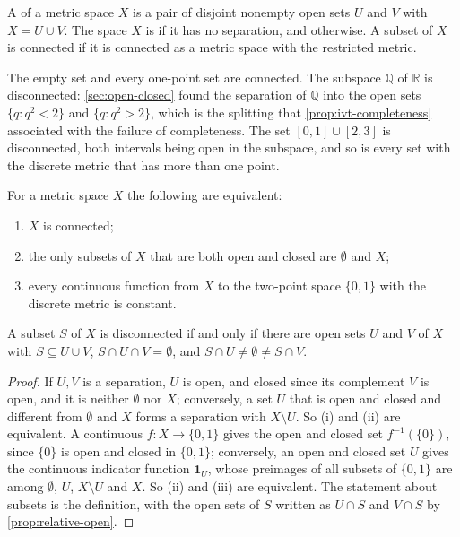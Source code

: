 \begin{definition}
\label{def:connected}
A  of a metric space $X$ is a pair of disjoint nonempty open sets $U$ and $V$ with $X=U\cup V$. The space $X$ is  if it has no separation, and  otherwise. A subset of $X$ is connected if it is connected as a metric space with the restricted metric.
\end{definition}

The empty set and every one-point set are connected. The subspace $\mathbb Q$ of $\mathbb R$ is disconnected: \cref{sec:open-closed} found the separation of $\mathbb Q$ into the open sets $\{q: q^2<2\}$ and $\{q: q^2>2\}$, which is the splitting that \cref{prop:ivt-completeness} associated with the failure of completeness. The set $[0,1]\cup[2,3]$ is disconnected, both intervals being open in the subspace, and so is every set with the discrete metric that has more than one point.

\begin{proposition}
\label{prop:connected-characterisations}
For a metric space $X$ the following are equivalent:
\begin{enumerate}
\item $X$ is connected;
\item the only subsets of $X$ that are both open and closed are $\emptyset$ and $X$;
\item every continuous function from $X$ to the two-point space $\{0,1\}$ with the discrete metric is constant.
\end{enumerate}
A subset $S$ of $X$ is disconnected if and only if there are open sets $U$ and $V$ of $X$ with $S\subseteq U\cup V$, $S\cap U\cap V=\emptyset$, and $S\cap U\ne\emptyset\ne S\cap V$.
\end{proposition}

\begin{proof}
If $U,V$ is a separation, $U$ is open, and closed since its complement $V$ is open, and it is neither $\emptyset$ nor $X$; conversely, a set $U$ that is open and closed and different from $\emptyset$ and $X$ forms a separation with $X\setminus U$. So (i) and (ii) are equivalent. A continuous $f\colon X\to\{0,1\}$ gives the open and closed set $f^{-1}(\{0\})$, since $\{0\}$ is open and closed in $\{0,1\}$; conversely, an open and closed set $U$ gives the continuous indicator function $\mathbf 1_U$, whose preimages of all subsets of $\{0,1\}$ are among $\emptyset$, $U$, $X\setminus U$ and $X$. So (ii) and (iii) are equivalent. The statement about subsets is the definition, with the open sets of $S$ written as $U\cap S$ and $V\cap S$ by \cref{prop:relative-open}.
\end{proof}


